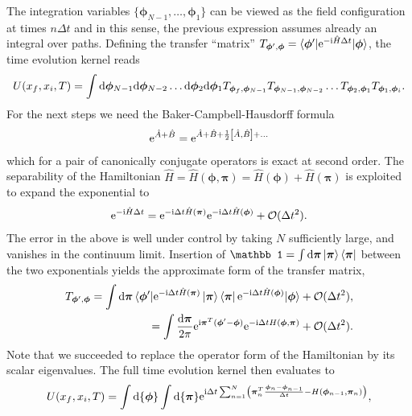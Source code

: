 The integration variables $\{{\bm\phi}_{N-1},\dots,{\bm\phi}_1\}$ can be viewed as the field configuration at times $n\Delta t$ and in this sense, the previous expression assumes already an integral over paths.
Defining the transfer ``matrix'' $T_{{\bm\phi}',{\bm\phi}}=\braket{{\bm\phi}'|\mathrm e^{-\mathrm i\hat H\Delta t}|{\bm\phi}}$, the time evolution kernel reads
\begin{align}
    U(x_f,x_i,T) =
    \int{\mathrm d{\bm\phi}_{N-1}\mathrm d{\bm\phi}_{N-2}\dots\mathrm d{\bm\phi}_2\mathrm d{\bm\phi}_1}
    T_{{\bm\phi}_f,{\bm\phi}_{{N-1}}}
    T_{{\bm\phi}_{{N-1}},{\bm\phi}_{{N-2}}}
    \dots
    T_{{\bm\phi}_{{2}},{\bm\phi}_{{1}}}
    T_{{\bm\phi}_{{1}},{\bm\phi}_i}.
\end{align}
For the next steps we need the Baker-Campbell-Hausdorff formula
\begin{align}
    \mathrm e^{\hat A+\hat B} = \mathrm e^{\hat A + \hat B + \frac12\left[ \hat A, \hat B \right]+\dots}
\end{align}
which for a pair of canonically conjugate operators is exact at second order.
The separability of the Hamiltonian $\hat H = \hat H(\bm\phi,\bm\pi) = \hat H(\bm\phi)+\hat H(\bm\pi)$ is exploited to expand the exponential to
\begin{align}
    \mathrm e^{-\mathrm i\hat H\Delta t}
    = \mathrm e^{-\mathrm i\Delta t\hat H(\bm\pi)}\mathrm e^{-\mathrm i\Delta t\hat H(\bm\phi)}+\mathcal O(\Delta t^2).
\end{align}
The error in the above is well under control by taking $N$ sufficiently large, and vanishes in the continuum limit.
Insertion of $\mathbb1=\int\rd\bm\pi\ket{\bm\pi}\bra{\bm\pi}$ between the two exponentials yields the approximate form of the transfer matrix,
\begin{align}
    T_{{\bm\phi}',{\bm\phi}} =
    \int\mathrm d\bm\pi
    \braket{{\bm\phi}'|\mathrm e^{-\mathrm i\Delta t\hat H(\bm\pi)}\ket{\bm\pi}\bra{\bm\pi}\mathrm e^{-\mathrm i\Delta t\hat H(\bm\phi)}|{\bm\phi}} + \mathcal O(\Delta t^2),
    \\
    =
    \int\frac{\mathrm d\bm\pi}{2\pi}\mathrm e^{\mathrm i\bm\pi^T(\bm\phi'-\bm\phi)}\mathrm e^{-\mathrm i\Delta t H(\bm\phi,\bm\pi)} + \mathcal O(\Delta t^2).
\end{align}
Note that we succeeded to replace the operator form of the Hamiltonian by its scalar eigenvalues.
The full time evolution kernel then evaluates to
\begin{align}
    U(x_f,x_i,T) =
    \int
    {\mathrm d\{\bm\phi\}}\int{\mathrm d\{\bm\pi\}}
    \mathrm e^{\mathrm i\Delta t\sum_{n=1}^{N}\left( \bm\pi_n^T\frac{\bm\phi_{n}-\bm\phi_{n-1}}{\Delta t}-H(\bm\phi_{n-1},\bm\pi_n) \right)},
    \label{eq:path_integral_pre_integration}
\end{align}
